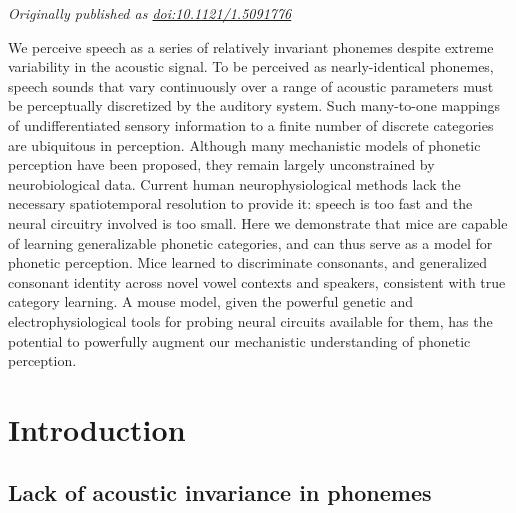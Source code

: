
\textit{Originally published as \href{https://doi.org/10.1121/1.5091776}{doi:10.1121/1.5091776}} \citep{saundersMiceCanLearn2019}

\begin{leftbar}
We perceive speech as a series of relatively invariant phonemes despite extreme variability in the acoustic signal. To be perceived as nearly-identical phonemes, speech sounds that vary continuously over a range of acoustic parameters must be perceptually discretized by the auditory system. Such many-to-one mappings of undifferentiated sensory information to a finite number of discrete categories are ubiquitous in perception. Although many mechanistic models of phonetic perception have been proposed, they remain largely unconstrained by neurobiological data. Current human neurophysiological methods lack the necessary spatiotemporal resolution to provide it: speech is too fast and the neural circuitry involved is too small. Here we demonstrate that mice are capable of learning generalizable phonetic categories, and can thus serve as a model for phonetic perception. Mice learned to discriminate consonants, and generalized consonant identity across novel vowel contexts and speakers, consistent with true category learning. A mouse model, given the powerful genetic and electrophysiological tools for probing neural circuits available for them, has the potential to powerfully augment our mechanistic understanding of phonetic perception.
\end{leftbar}

%
%
%
\section{Introduction}
\subsection{Lack of acoustic invariance in phonemes}

